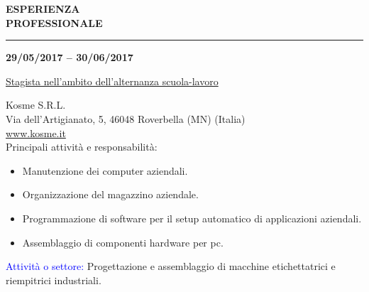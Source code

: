 \hspace{5mm}
\begin{minipage}[b]{0.3\textwidth}
	\textbf{ESPERIENZA \\PROFESSIONALE}
\end{minipage}%
\hfill
\hfill
\begin{minipage}[t]{0.6\textwidth}		
	\rule{\textwidth}{0.4pt}
\end{minipage}%
\vspace{5mm}


\begin{minipage}[t]{0.3\textwidth}
	\textbf{29/05/2017 – 30/06/2017}
\end{minipage}%
\hfill
\hfill
\begin{minipage}[t]{0.6\textwidth}		
	\begin{Large}
		\underline{Stagista nell'ambito dell'alternanza scuola-lavoro} \vspace{1mm}\\
	\end{Large} 
		Kosme S.R.L. \\
		Via dell'Artigianato, 5, 46048 Roverbella (MN) (Italia) \\
		\url{www.kosme.it} \vspace{1mm}\\
		Principali attività e responsabilità:
		\begin{itemize}
			\item Manutenzione dei computer aziendali.
			\item Organizzazione del magazzino aziendale.
			\item Programmazione di software per il setup automatico di applicazioni aziendali.
			\item Assemblaggio di componenti hardware per pc.
		\end{itemize}
	
		\textcolor{blue}{Attività o settore:} Progettazione e assemblaggio di macchine etichettatrici e riempitrici industriali.
	\vspace{4mm}
\end{minipage}%


